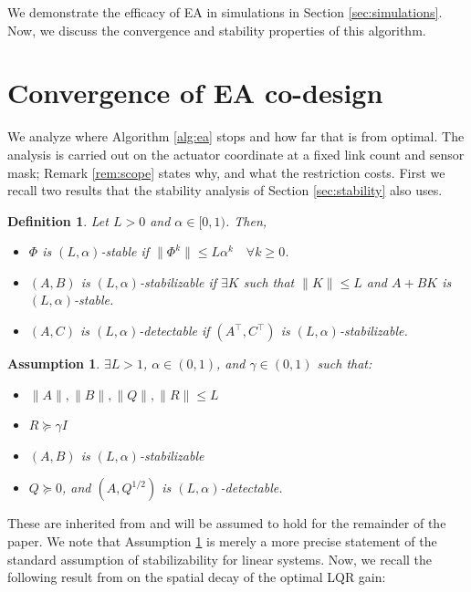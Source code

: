 \documentclass[letterpaper, 10pt, conference]{ieeeconf}
\newtheorem{assumption}{Assumption}
\newtheorem{definition}{Definition}
\begin{document}
We demonstrate the efficacy of EA in simulations in Section \ref{sec:simulations}. Now, we discuss the convergence and stability properties of this algorithm.

\section{Convergence of EA co-design} \label{sec:convergence}
We analyze where Algorithm \ref{alg:ea} stops and how far that is from optimal.
The analysis is carried out on the actuator coordinate at a fixed link count and
sensor mask; Remark \ref{rem:scope} states why, and what the restriction costs.
First we recall two results that the stability analysis of Section
\ref{sec:stability} also uses.

\begin{definition}
\label{def:stability}
Let $L > 0$ and $\alpha \in [0, 1)$. Then,
\begin{itemize}
    \item[(a)] $\Phi$ is \emph{$(L, \alpha)$-stable} if $\|\Phi^k\| \leq L\alpha^k \quad \forall k \geq 0$.
    \item[(b)] $(A, B)$ is \emph{$(L, \alpha)$-stabilizable} if $\exists K$ such that $\|K\| \leq L$ and $A + BK$ is $(L, \alpha)$-stable.
    \item[(c)] $(A, C)$ is \emph{$(L, \alpha)$-detectable} if $(A^\top, C^\top)$ is $(L, \alpha)$-stabilizable.
\end{itemize}
\end{definition}

\begin{assumption}
\label{as:system_params} $\exists L > 1$, $\alpha \in (0, 1)$, and $\gamma \in (0, 1)$ such that:
\begin{itemize}
    \item[(a)] $\|A\|, \|B\|, \|Q\|, \|R\| \leq L$
    \item[(b)] $R \succeq \gamma I$
    \item[(c)] $(A, B)$ is $(L, \alpha)$-stabilizable
    \item[(d)] $Q \succeq 0$, and $(A, Q^{1/2})$ is $(L, \alpha)$-detectable.
\end{itemize}
\end{assumption}

These are inherited from \cite{shin} and will be assumed to hold for the remainder of the paper. We note that Assumption \ref{as:system_params} is merely a more precise statement of the standard assumption of stabilizability for linear systems. Now, we recall the following result from \cite{shin} on the spatial decay of the optimal LQR gain:
\end{document}
